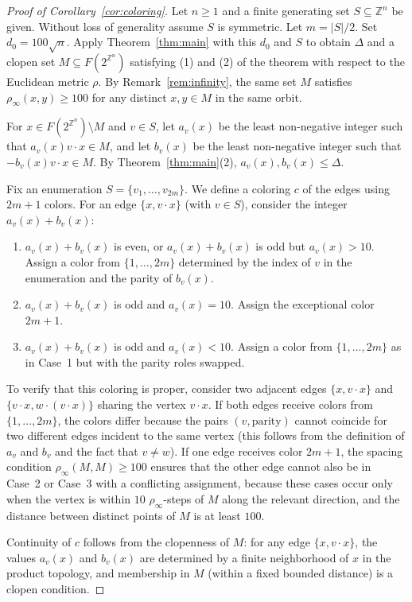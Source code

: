 \documentclass[10pt,a4paper]{amsart}
\begin{document}
\begin{proof}[Proof of Corollary~\ref{cor:coloring}]
Let $n\geq 1$ and a finite generating set $S\subseteq\mathbb{Z}^n$ be
given. Without loss of generality assume $S$ is symmetric. Let
$m=|S|/2$. Set
$d_0=100\sqrt{n}$. Apply Theorem~\ref{thm:main} with this $d_0$ and $S$
to obtain $\Delta$ and a clopen set $M\subseteq F(2^{\mathbb{Z}^n})$
satisfying (1) and (2) of the theorem with respect to the Euclidean
metric $\rho$. By Remark~\ref{rem:infinity}, the same set $M$ satisfies
$\rho_\infty(x,y)\geq 100$ for any distinct $x,y\in M$ in the same orbit.

For $x\in F(2^{\mathbb{Z}^n})\setminus M$ and $v\in S$, let $a_v(x)$ be
the least non-negative integer such that $a_v(x)v\cdot x\in M$, and let
$b_v(x)$ be the least non-negative integer such that
$-b_v(x)v\cdot x\in M$.
By Theorem~\ref{thm:main}(2), $a_v(x), b_v(x)\leq\Delta$.

Fix an enumeration $S=\{v_1,\dots,v_{2m}\}$. We define a coloring $c$ of
the edges using $2m+1$ colors. For an edge $\{x, v\cdot x\}$ (with
$v\in S$), consider the integer $a_v(x)+b_v(x)$:

\begin{enumerate}
\item[Case 1.] $a_v(x)+b_v(x)$ is even, or $a_v(x)+b_v(x)$ is odd but
$a_v(x)>10$. Assign a color from $\{1,\dots,2m\}$ determined by the
index of $v$ in the enumeration and the parity of $b_v(x)$.

\item[Case 2.] $a_v(x)+b_v(x)$ is odd and $a_v(x)=10$. Assign the
exceptional color $2m+1$.

\item[Case 3.] $a_v(x)+b_v(x)$ is odd and $a_v(x)<10$. Assign a color
from $\{1,\dots,2m\}$ as in Case~1 but with the parity roles swapped.
\end{enumerate}

To verify that this coloring is proper, consider two adjacent edges
$\{x, v\cdot x\}$ and $\{v\cdot x, w\cdot(v\cdot x)\}$ sharing the
vertex $v\cdot x$. If both edges receive colors from $\{1,\dots,2m\}$,
the colors differ because the pairs $(v, \text{parity})$ cannot coincide
for two different edges incident to the same vertex (this follows from
the definition of $a_v$ and $b_v$ and the fact that $v\neq w$). If one
edge receives color $2m+1$, the spacing condition
$\rho_\infty(M,M)\geq 100$ ensures that the other edge cannot also be
in Case~2 or Case~3 with a conflicting assignment, because these cases
occur only when the vertex is within $10$ $\rho_\infty$-steps of $M$
along the relevant direction, and the distance between distinct points
of $M$ is at least $100$.

Continuity of $c$ follows from the clopenness of $M$: for any edge
$\{x, v\cdot x\}$, the values $a_v(x)$ and $b_v(x)$ are determined by a
finite neighborhood of $x$ in the product topology, and membership in
$M$ (within a fixed bounded distance) is a clopen condition.
\end{proof}
\end{document}
